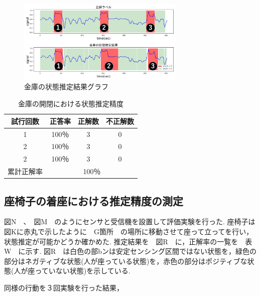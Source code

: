 \documentclass[Japanese]{dicomopapers}
\begin{document}
\begin{figure}[ht]
    \centering
    \includegraphics[width=8cm]{kinko_graph.png}
    \caption{金庫の状態推定結果グラフ}
    \label{kinko_graph}
\end{figure}

\begin{table}[htb]
    \begin{center}
        \caption{金庫の開閉における状態推定精度}
        \label{kinko_fig}
        \begin{tabular}{|c|c|c|c|} \hline
        試行回数 & 正答率 & 正解数 & 不正解数 \\ \hline
        1 & 100％ & 3 & 0 \\ \hline
        2 & 100％ & 3 & 0 \\ \hline
        2 & 100％ & 3 & 0 \\ \hline \hline
        累計正解率 & \multicolumn{3}{c|}{100％} \\ \hline
        \end{tabular}
    \end{center}
\end{table}

\subsection{座椅子の着座における推定精度の測定}
図N　、　図M　のようにセンサと受信機を設置して評価実験を行った.
座椅子は図Kに赤丸で示したように　G箇所　の場所に移動させて座って立ってを行い，状態推定が可能かどうか確かめた.
推定結果を　図R　に，正解率の一覧を　表W　に示す.
図R　は白色の部bンは安定センシング区間ではない状態を，緑色の部分はネガティブな状態(人が座っている状態)を，赤色の部分はポジティブな状態(人が座っていない状態)を示している.


同様の行動を３回実験を行った結果，






\end{document}
